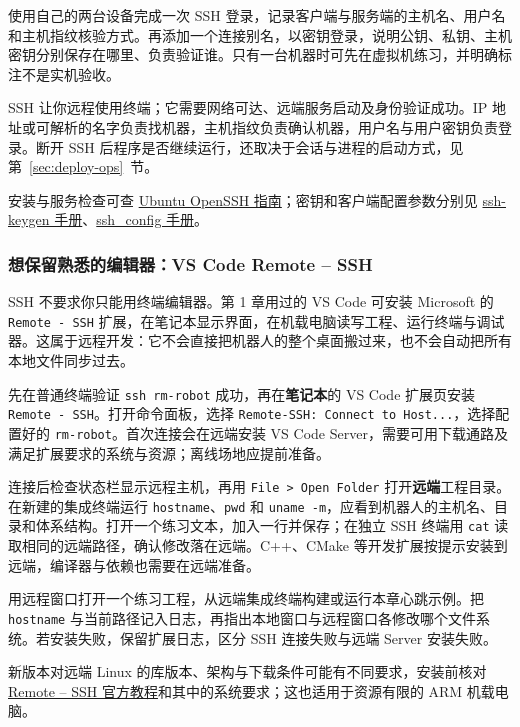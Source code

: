 \begin{exercise}\label{ex:deploy-ssh}
使用自己的两台设备完成一次 SSH 登录，记录客户端与服务端的主机名、用户名和主机指纹核验方式。再添加一个连接别名，以密钥登录，说明公钥、私钥、主机密钥分别保存在哪里、负责验证谁。只有一台机器时可先在虚拟机练习，并明确标注不是实机验收。
\end{exercise}

\begin{conclusion}
SSH 让你远程使用终端；它需要网络可达、远端服务启动及身份验证成功。IP 地址或可解析的名字负责找机器，主机指纹负责确认机器，用户名与用户密钥负责登录。断开 SSH 后程序是否继续运行，还取决于会话与进程的启动方式，见第~\ref{sec:deploy-ops}~节。
\end{conclusion}

安装与服务检查可查 \href{https://ubuntu.com/server/docs/how-to/security/openssh-server/}{Ubuntu OpenSSH 指南}；密钥和客户端配置参数分别见 \href{https://man.openbsd.org/ssh-keygen}{ssh-keygen 手册}、\href{https://man.openbsd.org/ssh_config}{ssh\_config 手册}。

\subsubsection{想保留熟悉的编辑器：VS Code Remote -- SSH}

SSH 不要求你只能用终端编辑器。第 1 章用过的 VS Code 可安装 Microsoft 的 \texttt{Remote - SSH} 扩展，在笔记本显示界面，在机载电脑读写工程、运行终端与调试器。这属于远程开发：它不会直接把机器人的整个桌面搬过来，也不会自动把所有本地文件同步过去。

\begin{example}[确认编辑与编译发生在哪台电脑]
先在普通终端验证 \texttt{ssh rm-robot} 成功，再在\textbf{笔记本}的 VS Code 扩展页安装 \texttt{Remote - SSH}。打开命令面板，选择 \texttt{Remote-SSH: Connect to Host...}，选择配置好的 \texttt{rm-robot}。首次连接会在远端安装 VS Code Server，需要可用下载通路及满足扩展要求的系统与资源；离线场地应提前准备。

连接后检查状态栏显示远程主机，再用 \texttt{File > Open Folder} 打开\textbf{远端}工程目录。在新建的集成终端运行 \texttt{hostname}、\texttt{pwd} 和 \texttt{uname -m}，应看到机器人的主机名、目录和体系结构。打开一个练习文本，加入一行并保存；在独立 SSH 终端用 \texttt{cat} 读取相同的远端路径，确认修改落在远端。C++、CMake 等开发扩展按提示安装到远端，编译器与依赖也需要在远端准备。
\end{example}

\begin{exercise}\label{ex:deploy-remote-editor}
用远程窗口打开一个练习工程，从远端集成终端构建或运行本章心跳示例。把 \texttt{hostname} 与当前路径记入日志，再指出本地窗口与远程窗口各修改哪个文件系统。若安装失败，保留扩展日志，区分 SSH 连接失败与远端 Server 安装失败。
\end{exercise}

新版本对远端 Linux 的库版本、架构与下载条件可能有不同要求，安装前核对 \href{https://code.visualstudio.com/docs/remote/ssh}{Remote -- SSH 官方教程}和其中的系统要求；这也适用于资源有限的 ARM 机载电脑。
